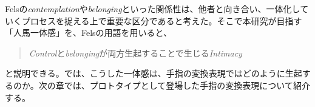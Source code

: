 
Felsの\textit{contemplation}や\textit{belonging}といった関係性は、他者と向き合い、一体化していくプロセスを捉える上で重要な区分であると考えた。そこで本研究が目指す「人馬一体感」を、Felsの用語を用いると、
\begin{quote}
\textit{Control}と\textit{belonging}が両方生起することで生じる\textit{Intimacy}  
\end{quote}
と説明できる。では、こうした一体感は、手指の変換表現ではどのように生起するのか。次の章では、プロトタイプとして登場した手指の変換表現について紹介する。






